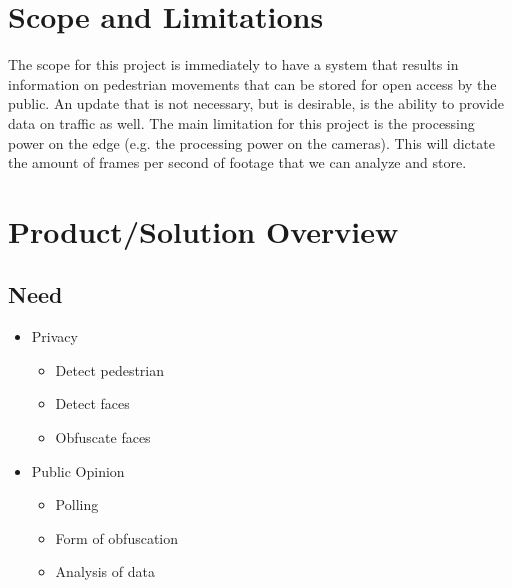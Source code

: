 \documentclass[onecolumn, draftclsnofoot,10pt, compsoc]{IEEEtran}
\begin{document}
\section{Scope and Limitations}
The scope for this project is immediately to have a system that results in information on pedestrian movements that can be stored for open access by the public. An update that is not necessary, but is desirable, is the ability to provide data on traffic as well. The main limitation for this project is the processing power on the edge (e.g. the processing power on the cameras). This will dictate the amount of frames per second of footage that we can analyze and store.


\section{Product/Solution Overview}
\begin{varwidth}[t]{.5\textwidth}
\subsection{Need}
\begin{itemize}
    \item Privacy
        \begin{itemize}
            \item Detect pedestrian
            \item Detect faces
            \item Obfuscate faces
        \end{itemize}
    \item Public Opinion
        \begin{itemize}
            \item Polling
            \item Form of obfuscation
            \item Analysis of data
        \end{itemize}
\end{itemize}
\end{varwidth}%
\hspace{4em}%
\end{document}
